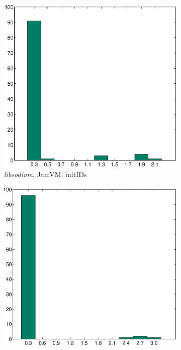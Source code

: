 \documentclass[a4paper,12pt,twoside,openright]{report}
\newcommand{\tool}[1]{\emph{#1}}
\newcommand{\lib}[1]{\tool{lib#1}}
\begin{document}
\begin{figure}[t!]
	\centering
	\begin{subfigure}{0.45\textwidth}
		\centering
		\includegraphics[width=\textwidth]{10_sodium.eps}
		\caption{\lib{sodium}, JamVM, initIDs}
	\end{subfigure}
	\begin{subfigure}{0.45\textwidth}
		\centering
		\includegraphics[width=\textwidth]{10_matrix5.eps}

\end{subfigure}
\end{figure}
\end{document}
